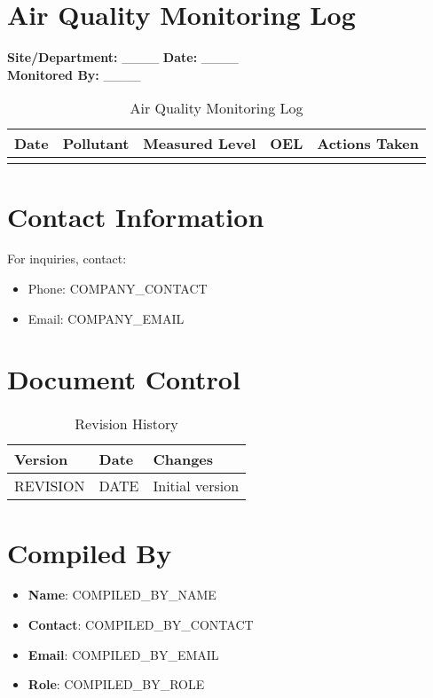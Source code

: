 \documentclass[12pt]{article}
\begin{document}
\section{Air Quality Monitoring Log}

\textbf{Site/Department:} \_\_\_\_ \textbf{Date:} \_\_\_\_\\
\textbf{Monitored By:} \_\_\_\_

\begin{table}[h]
    \centering
    \begin{tabular}{p{2cm}p{2cm}p{2cm}p{2cm}p{3cm}}
        \toprule
        \textbf{Date} & \textbf{Pollutant} & \textbf{Measured Level} & \textbf{OEL} & \textbf{Actions Taken} \\
        \midrule
        & & & & \\
        \bottomrule
    \end{tabular}
    \caption{Air Quality Monitoring Log}
\end{table}

\section{Contact Information}
For inquiries, contact:
\begin{itemize}
    \item Phone: {{COMPANY_CONTACT}}
    \item Email: {{COMPANY_EMAIL}}
\end{itemize}

\section{Document Control}
\begin{table}[h]
    \centering
    \begin{tabular}{p{3cm}p{3cm}p{6cm}}
        \toprule
        \textbf{Version} & \textbf{Date} & \textbf{Changes} \\
        \midrule
        {{REVISION}} & {{DATE}} & Initial version \\
        \bottomrule
    \end{tabular}
    \caption{Revision History}
\end{table}

\section{Compiled By}
\begin{itemize}
    \item \textbf{Name}: {{COMPILED_BY_NAME}}
    \item \textbf{Contact}: {{COMPILED_BY_CONTACT}}
    \item \textbf{Email}: {{COMPILED_BY_EMAIL}}
    \item \textbf{Role}: {{COMPILED_BY_ROLE}}
\end{itemize}
\end{document}
